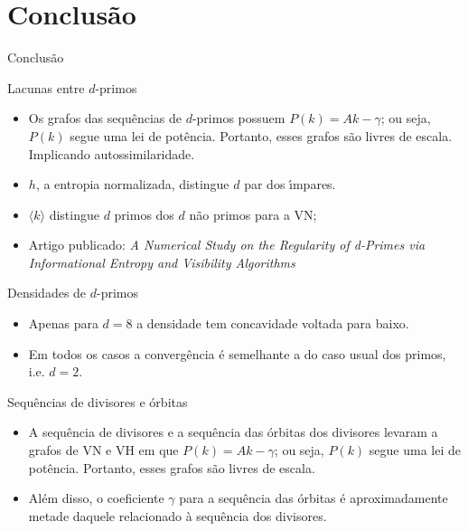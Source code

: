 \documentclass[12pt,
aspectratio=169,
]{beamer}
\begin{document}
\section{Conclusão}


\begin{nobarframe}
\vfill
\begin{center}
\Large
Conclusão
\end{center}
\vfill
\end{nobarframe}


\begin{frame}{Lacunas entre $d$-primos}
    \begin{itemize}
        \item Os grafos das sequ\^encias de $d$-primos possuem $P(k) = A k−\gamma$; 
        ou seja, $P(k)$ segue uma lei de pot\^encia.  Portanto, esses
grafos s\~ao livres de escala. Implicando autossimilaridade.

    \item $h$, a entropia normalizada, distingue $d$ par dos \'\i mpares. 
    \item $\langle k \rangle$ distingue $d$ primos dos
$d$ n\~ao  primos para a VN;
    \item Artigo publicado: \emph{A Numerical Study on the Regularity of d-Primes via Informational Entropy and Visibility Algorithms}
    \end{itemize}
\end{frame}


\begin{frame}{Densidades de $d$-primos}
    \begin{itemize}
        \item Apenas para $d = 8$ a densidade tem concavidade voltada para baixo.
        \item Em todos os casos a converg\^encia \'e semelhante a do caso usual dos primos, i.e. $d=2$.
    \end{itemize}
\end{frame}


\begin{frame}{Sequ\^encias de divisores e \'orbitas}
    \begin{itemize}
        \item A sequ\^encia de divisores e a sequ\^encia das \'orbitas dos divisores levaram a grafos de VN e VH em que $P(k) = A k−\gamma$; ou seja, $P(k)$ segue uma lei de pot\^encia. Portanto, esses
grafos s\~ao livres de escala. 
        \item Al\'em disso, o coeficiente $\gamma$ para a sequ\^encia das \'orbitas \'e aproximadamente metade daquele relacionado \`a sequ\^encia dos divisores.
        
    \end{itemize}
\end{frame}
\end{document}
